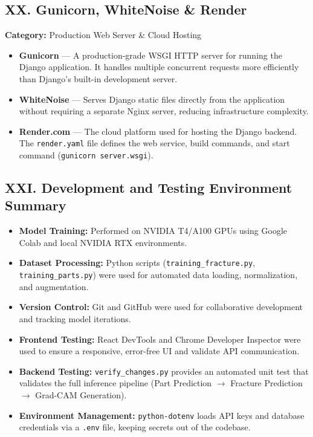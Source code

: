 \documentclass[a4paper,12pt]{report}
\begin{document}
    \subsection*{XX. Gunicorn, WhiteNoise \& Render}
    \textbf{Category:} Production Web Server \& Cloud Hosting\\
    \begin{itemize}
        \item \textbf{Gunicorn} — A production-grade WSGI HTTP server for running the Django application. It handles multiple concurrent requests more efficiently than Django's built-in development server.
        \item \textbf{WhiteNoise} — Serves Django static files directly from the application without requiring a separate Nginx server, reducing infrastructure complexity.
        \item \textbf{Render.com} — The cloud platform used for hosting the Django backend. The \texttt{render.yaml} file defines the web service, build commands, and start command (\texttt{gunicorn server.wsgi}).
    \end{itemize}

    \subsection*{XXI. Development and Testing Environment Summary}
    \begin{itemize}
        \item \textbf{Model Training:} Performed on NVIDIA T4/A100 GPUs using Google Colab and local NVIDIA RTX environments.
        \item \textbf{Dataset Processing:} Python scripts (\texttt{training\_fracture.py}, \texttt{training\_parts.py}) were used for automated data loading, normalization, and augmentation.
        \item \textbf{Version Control:} Git and GitHub were used for collaborative development and tracking model iterations.
        \item \textbf{Frontend Testing:} React DevTools and Chrome Developer Inspector were used to ensure a responsive, error-free UI and validate API communication.
        \item \textbf{Backend Testing:} \texttt{verify\_changes.py} provides an automated unit test that validates the full inference pipeline (Part Prediction $\to$ Fracture Prediction $\to$ Grad-CAM Generation).
        \item \textbf{Environment Management:} \texttt{python-dotenv} loads API keys and database credentials via a \texttt{.env} file, keeping secrets out of the codebase.
    \end{itemize}
\end{document}
